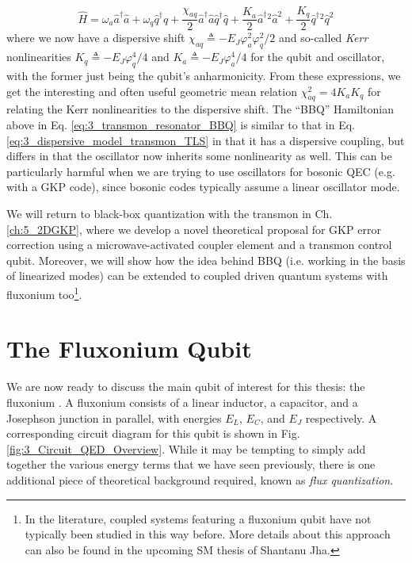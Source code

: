 \begin{equation}
    \hat{H} = \omega_a \hat{a}^\dagger\hat{a} + \omega_q \hat{q}^\dagger\hat{q} + \frac{\chi_{aq}}{2}\hat{a}^\dagger\hat{a}\hat{q}^\dagger\hat{q}  + \frac{K_a}{2}\hat{a}^\dagger{}^2\hat{a}^2 + \frac{K_q}{2}\hat{q}^\dagger{}^2\hat{q}^2
    \label{eq:3_transmon_resonator_BBQ}
\end{equation}
where we now have a dispersive shift $\chi_{aq} \triangleq -E_J\varphi_a^2 \varphi_q^2/2$ and so-called \textit{Kerr} nonlinearities $K_q \triangleq -E_J\varphi_q^4/4$ and $K_a \triangleq -E_J\varphi_a^4/4$ for the qubit and oscillator, with the former just being the qubit's anharmonicity. From these expressions, we get the interesting and often useful geometric mean relation $\chi_{aq}^2 = 4K_aK_q$ for relating the Kerr nonlinearities to the dispersive shift. The ``BBQ'' Hamiltonian above in Eq. \eqref{eq:3_transmon_resonator_BBQ} is similar to that in Eq. \eqref{eq:3_dispersive_model_transmon_TLS} in that it has a dispersive coupling, but differs in that the oscillator now inherits some nonlinearity as well. This can be particularly harmful when we are trying to use oscillators for bosonic QEC (e.g. with a GKP code), since bosonic codes typically assume a linear oscillator mode. 

We will return to black-box quantization with the transmon in Ch. \ref{ch:5_2DGKP}, where we develop a novel theoretical proposal for GKP error correction using a microwave-activated coupler element and a transmon control qubit. Moreover, we will show how the idea behind BBQ (i.e. working in the basis of linearized modes) can be extended to coupled driven quantum systems with fluxonium too\footnote{In the literature, coupled systems featuring a fluxonium qubit have not typically been studied in this way before. More details about this approach can also be found in the upcoming SM thesis of Shantanu Jha.}. 


\clearpage
\section{The Fluxonium Qubit}

We are now ready to discuss the main qubit of interest for this thesis: the fluxonium \cite{manucharyan2009fluxonium}. A fluxonium consists of a linear inductor, a capacitor, and a Josephson junction in parallel, with energies $E_L$, $E_C$, and $E_J$ respectively. A corresponding circuit diagram for this qubit is shown in Fig. \eqref{fig:3_Circuit_QED_Overview}. While it may be tempting to simply add together the various energy terms that we have seen previously, there is one additional piece of theoretical background required, known as \textit{flux quantization}. 

